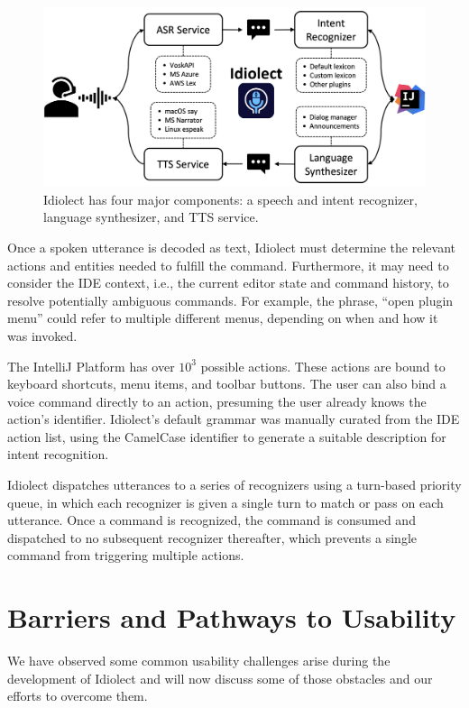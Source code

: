 \documentclass{article}
\theoremstyle{plain}
\theoremstyle{definition}
\theoremstyle{remark}
\begin{document}
\begin{figure}[t]
    \centering
    \includegraphics[width=0.9\linewidth]{architecture.png}
    \caption{Idiolect has four major components: a speech and intent recognizer, language synthesizer, and TTS service.}
    \label{fig:architectural_overview}
\end{figure}

Once a spoken utterance is decoded as text, Idiolect must determine the relevant actions and entities needed to fulfill the command. Furthermore, it may need to consider the IDE context, i.e., the current editor state and command history, to resolve potentially ambiguous commands. For example, the phrase, ``open plugin menu'' could refer to multiple different menus, depending on when and how it was invoked.

The IntelliJ Platform has over $10^3$ possible actions. These actions are bound to keyboard shortcuts, menu items, and toolbar buttons. The user can also bind a voice command directly to an action, presuming the user already knows the action's identifier. Idiolect's default grammar was manually curated from the IDE action list, using the CamelCase identifier to generate a suitable description for intent recognition.

Idiolect dispatches utterances to a series of recognizers using a turn-based priority queue, in which each recognizer is given a single turn to match or pass on each utterance. Once a command is recognized, the command is consumed and dispatched to no subsequent recognizer thereafter, which prevents a single command from triggering multiple actions.

\section{Barriers and Pathways to Usability}\label{sec:usability}

We have observed some common usability challenges arise during the development of Idiolect and will now discuss some of those obstacles and our efforts to overcome them.
\end{document}
